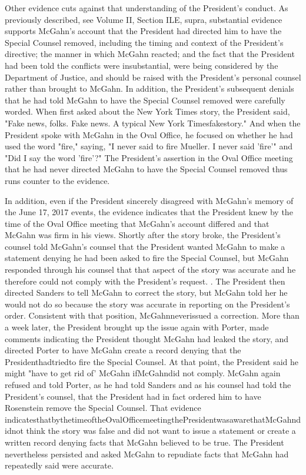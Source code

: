 Other evidence cuts against that understanding of the President's conduct.
As previously described, see Volume II, Section ILE, supra, substantial evidence supports McGahn's account that the President had directed him to have the Special Counsel removed, including the timing and context of the President's directive;
the manner in which McGahn reacted;
and the fact that the President had been told the conflicts were insubstantial, were being considered by the Department of Justice, and should be raised with the President's personal counsel rather than brought to McGahn.
In addition, the President's subsequent denials that he had told McGahn to have the Special Counsel removed were carefully worded.
When first asked about the New York Times story, the President said, "Fake news, folks.
Fake news.
A typical New York Timesfakestory." And when the President spoke with McGahn in the Oval Office, he focused on whether he had used the word "fire," saying, "I never said to fire Mueller.
I never said 'fire'" and "Did I say the word 'fire'?" The President's assertion in the Oval Office meeting that he had never directed McGahn to have the Special Counsel removed thus runs counter to the evidence.

In addition, even if the President sincerely disagreed with McGahn's memory of the June 17, 2017 events, the evidence indicates that the President knew by the time of the Oval Office
meeting that McGahn's account differed and that McGahn was firm in his views.
Shortly after the story broke, the President's counsel told McGahn's counsel that the President wanted McGahn to make a statement denying he had been asked to fire the Special Counsel, but McGahn responded through his counsel that that aspect of the story was accurate and he therefore could not comply with the President's request. .
The President then directed Sanders to tell McGahn to correct the story, but McGahn told her he would not do so because the story was accurate in reporting on the President's order.
Consistent with that position, McGahnneverissued a correction.
More than a week later, the President brought up the issue again with Porter, made comments indicating the President thought McGahn had leaked the story, and directed Porter to have McGahn create a record denying that the Presidenthadtriedto fire the Special Counsel.
At that point, the President said he might "have to get rid of' McGahn ifMcGahndid not comply.
McGahn again refused and told Porter, as he had told Sanders and as his counsel had told the President's counsel, that the President had in fact ordered him to have Rosenstein remove the Special Counsel.
That evidence indicatesthatbythetimeoftheOvalOfficemeetingthePresidentwasawarethatMcGahndidnot think the story was false and did not want to issue a statement or create a written record denying facts that McGahn believed to be true.
The President nevertheless persisted and asked McGahn to repudiate facts that McGahn had repeatedly said were accurate.


